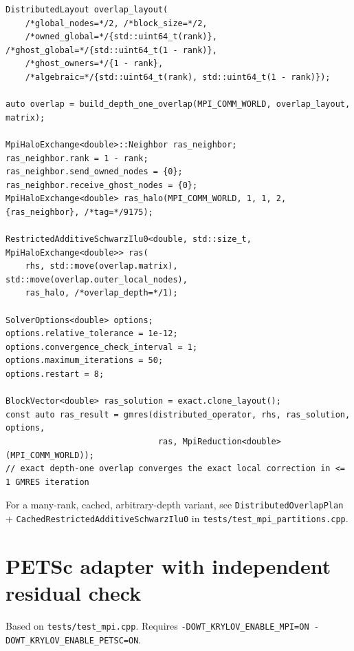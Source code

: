 \documentclass[11pt,a4paper]{report}
\begin{document}
\begin{lstlisting}
DistributedLayout overlap_layout(
    /*global_nodes=*/2, /*block_size=*/2,
    /*owned_global=*/{std::uint64_t(rank)}, /*ghost_global=*/{std::uint64_t(1 - rank)},
    /*ghost_owners=*/{1 - rank},
    /*algebraic=*/{std::uint64_t(rank), std::uint64_t(1 - rank)});

auto overlap = build_depth_one_overlap(MPI_COMM_WORLD, overlap_layout, matrix);

MpiHaloExchange<double>::Neighbor ras_neighbor;
ras_neighbor.rank = 1 - rank;
ras_neighbor.send_owned_nodes = {0};
ras_neighbor.receive_ghost_nodes = {0};
MpiHaloExchange<double> ras_halo(MPI_COMM_WORLD, 1, 1, 2, {ras_neighbor}, /*tag=*/9175);

RestrictedAdditiveSchwarzIlu0<double, std::size_t, MpiHaloExchange<double>> ras(
    rhs, std::move(overlap.matrix), std::move(overlap.outer_local_nodes),
    ras_halo, /*overlap_depth=*/1);

SolverOptions<double> options;
options.relative_tolerance = 1e-12;
options.convergence_check_interval = 1;
options.maximum_iterations = 50;
options.restart = 8;

BlockVector<double> ras_solution = exact.clone_layout();
const auto ras_result = gmres(distributed_operator, rhs, ras_solution, options,
                               ras, MpiReduction<double>(MPI_COMM_WORLD));
// exact depth-one overlap converges the exact local correction in <= 1 GMRES iteration
\end{lstlisting}

For a many-rank, cached, arbitrary-depth variant, see
\lstinline!DistributedOverlapPlan! + \lstinline!CachedRestrictedAdditiveSchwarzIlu0!
in \texttt{tests/test\_mpi\_partitions.cpp}.

\section{PETSc adapter with independent residual check}
\label{sec:11.4}

Based on \texttt{tests/test\_mpi.cpp}. Requires
\lstinline!-DOWT_KRYLOV_ENABLE_MPI=ON -DOWT_KRYLOV_ENABLE_PETSC=ON!.
\end{document}
